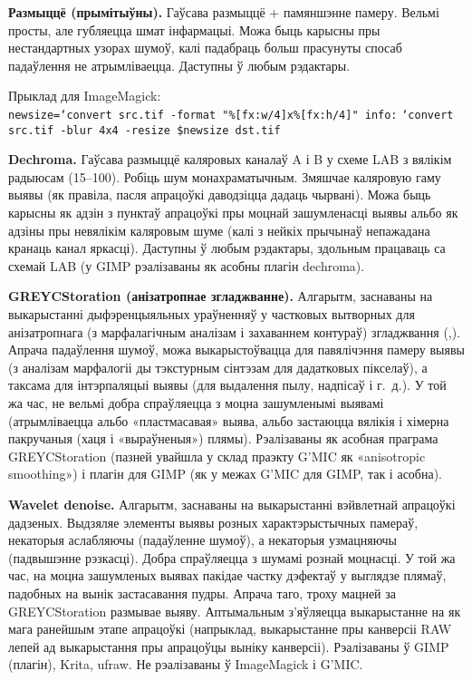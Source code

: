 \documentclass[10pt, a5paper]{article}
\def\fakeparagraph#1{\textbf{#1}}
\begin{document}
\fakeparagraph{Размыццё (прымітыўны).}
Гаўсава размыццё + памяншэнне памеру. Вельмі просты, але губляецца шмат інфармацыі. Можа быць карысны пры нестандартных узорах шумоў, калі падабраць больш прасунуты спосаб падаўлення не атрымліваецца. Даступны ў любым рэдактары.

Прыклад для {ImageMagick}:\\
\texttt{newsize=`convert src.tif -format "\%[fx:w/4]x\%[fx:h/4]" info:}
\texttt{`convert src.tif -blur 4x4 -resize \$newsize dst.tif}

\fakeparagraph{Dechroma.}
Гаўсава размыццё каляровых каналаў A і B у схеме LAB з вялікім радыюсам (15--100). Робіць шум монахраматычным. Змяшчае каляровую гаму выявы (як правіла, пасля апрацоўкі даводзіцца дадаць чырвані). Можа быць карысны як адзін з пунктаў апрацоўкі пры моцнай зашумленасці выявы альбо як адзіны пры невялікім каляровым шуме (калі з нейкіх прычынаў непажадана кранаць канал яркасці). Даступны ў любым рэдактары, здольным працаваць са схемай LAB (у {GIMP} рэалізаваны як асобны плагін {dechroma}).

\fakeparagraph{GREYCStoration (анізатропнае згладжванне).}
Алгарытм, \linebreak заснаваны на выкарыстанні дыфэренцыяльных ураўненняў у частковых вытворных для анізатропнага (з марфалагічным аналізам і захаваннем контураў) згладжвання (\cite{litvw1},\cite{litvw2}). Апрача падаўлення шумоў, можа выкарыстоўвацца для павялічэння памеру выявы (з аналізам марфалогіі ды тэкстурным сінтэзам для дадатковых пікселаў), а таксама для інтэрпаляцыі выявы (для выдалення пылу, надпісаў і г.~д.). У той жа час, не вельмі добра спраўляецца з моцна зашумленымі выявамі (атрымліваецца альбо «пластмасавая» выява, альбо застаюцца вялікія і хімерна пакручаныя (хаця і «выраўненыя») плямы).  Рэалізаваны як асобная праграма {GREYCStoration} (пазней увайшла у склад праэкту {G'MIC} як «anisotropic smoothing»)  і плагін для {GIMP} (як у межах {G'MIC для GIMP}, так і асобна).

\fakeparagraph{Wavelet denoise.}
Алгарытм, заснаваны на выкарыстанні вэйвлетнай апрацоўкі дадзеных. Выдзяляе элементы выявы розных характэрыстычных памераў, некаторыя аслабляючы (падаўленне шумоў), а некаторыя узмацняючы (падвышэнне рэзкасці).  Добра спраўляецца з шумамі рознай моцнасці. У той жа час, на моцна зашумленых выявах пакідае частку дэфектаў у выглядзе плямаў, падобных на вынік застасавання пудры. Апрача таго, троху мацней за GREYCStoration размывае выяву. Аптымальным з’яўляецца выкарыстанне на як мага ранейшым этапе апрацоўкі (напрыклад, выкарыстанне пры канверсіі RAW лепей ад выкарыстання пры апрацоўцы выніку канверсіі). Рэалізаваны ў {GIMP} (плагін), {Krita}, {ufraw}. Не рэалізаваны ў {ImageMagick} і {G'MIC}.
\end{document}
